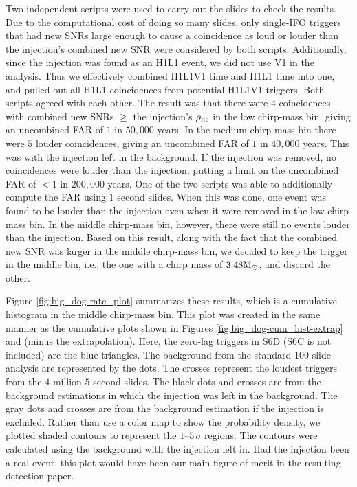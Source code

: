 Two independent scripts were used to carry out the slides to check the results. Due to the computational cost of doing so many slides, only single-\ac{IFO} triggers that had new \acp{SNR} large enough to cause a coincidence as loud or louder than the injection's combined new \ac{SNR} were considered by both scripts. Additionally, since the injection was found as an H1L1 event, we did not use V1 in the analysis. Thus we effectively combined H1L1V1 time and H1L1 time into one, and pulled out all H1L1 coincidences from potential H1L1V1 triggers. Both scripts agreed with each other. The result was that there were $4$ coincidences with combined new \acp{SNR} $\geq$ the injection's $\rho_{\mathrm{nc}}$ in the low chirp-mass bin, giving an uncombined \ac{FAR} of $1$ in $50,000$ years. In the medium chirp-mass bin there were $5$ louder coincidences, giving an uncombined \ac{FAR} of $1$ in $40,000$ years. This was with the injection left in the background. If the injection was removed, no coincidences were louder than the injection, putting a limit on the uncombined \ac{FAR} of $< 1$ in $200,000$ years. One of the two scripts was able to additionally compute the \ac{FAR} using $1$ second slides. When this was done, one event was found to be louder than the injection even when it were removed in the low chirp-mass bin. In the middle chirp-mass bin, however, there were still no events louder than the injection. Based on this result, along with the fact that the combined new \ac{SNR} was larger in the middle chirp-mass bin, we decided to keep the trigger in the middle bin, i.e., the one with a chirp mass of $3.48\mathrm{M_\odot}$, and discard the other.

Figure \ref{fig:big_dog-rate_plot} summarizes these results, which is a cumulative histogram in the middle chirp-mass bin. This plot was created in the same manner as the cumulative plots shown in Figures \ref{fig:big_dog-cum_hist-extrap} and (minus the extrapolation). Here, the zero-lag triggers in S6D (S6C is not included) are the blue triangles. The background from the standard 100-slide analysis are represented by the dots. The crosses represent the loudest triggers from the $4$ million $5$ second slides. The black dots and crosses are from the background estimations in which the injection was left in the background. The gray dots and crosses are from the background estimation if the injection is excluded. Rather than use a color map to show the probability density, we plotted shaded contours to represent the $1$--$5\,\sigma$ regions. The contours were calculated using the background with the injection left in. Had the injection been a real event, this plot would have been our main figure of merit in the resulting detection paper.

